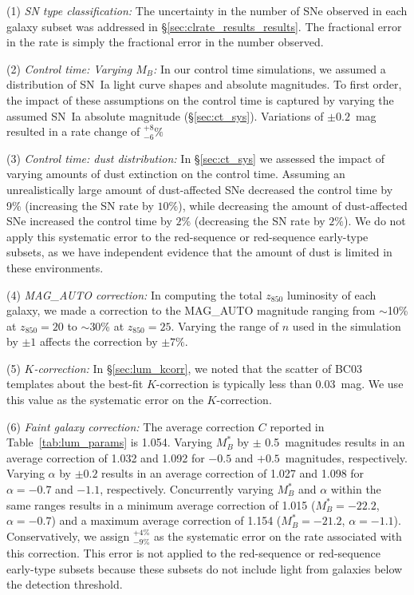 (1) \emph{SN type classification:} The uncertainty in the number of
SNe observed in each galaxy subset was addressed in
\S\ref{sec:clrate_results_results}. The fractional error in the rate is simply the
fractional error in the number observed.

(2) \emph{Control time: Varying $M_B$:} In our control time
simulations, we assumed a distribution of SN~Ia light curve shapes and
absolute magnitudes. To first order, the impact of these assumptions
on the control time is captured by varying the assumed SN~Ia absolute
magnitude (\S\ref{sec:ct_sys}). Variations of $\pm 0.2$~mag resulted in a
rate change of $^{+8}_{-6}\%$

(3) \emph{Control time: dust distribution:} In \S\ref{sec:ct_sys} we
assessed the impact of varying amounts of dust extinction on the
control time. Assuming an unrealistically large amount of
dust-affected SNe decreased the control time by 9\% (increasing the SN
rate by $10\%$), while decreasing the amount of dust-affected SNe
increased the control time by $2\%$ (decreasing the SN rate by
$2\%$). We do not apply this systematic error to the red-sequence or
red-sequence early-type subsets, as we have independent evidence that
the amount of dust is limited in these environments.

(4) \emph{MAG\_AUTO correction:} In computing the total $z_{850}$ luminosity
of each galaxy, we made a correction to the MAG\_AUTO magnitude
ranging from $\sim$10\% at $z_{850}=20$ to $\sim$30\% at
$z_{850}=25$. Varying the range of $n$ used in the simulation by $\pm
1$ affects the correction by $\pm 7\%$.

(5) \emph{$K$-correction:} In \S\ref{sec:lum_kcorr}, we noted that the
scatter of BC03 templates about the best-fit $K$-correction is
typically less than 0.03~mag. We use this value as the systematic
error on the $K$-correction.

(6) \emph{Faint galaxy correction:} The average correction $C$
reported in Table~\ref{tab:lum_params} is 1.054. Varying $M^\ast_B$ by
$\pm$ 0.5~magnitudes results in an average correction of 1.032 and
1.092 for $-0.5$ and $+0.5$~magnitudes, respectively. Varying $\alpha$
by $\pm 0.2$ results in an average correction of 1.027 and 1.098 for
$\alpha = -0.7$ and $-1.1$, respectively. Concurrently varying
$M^\ast_B$ and $\alpha$ within the same ranges results in a minimum
average correction of 1.015 ($M^\ast_B = -22.2$, $\alpha = -0.7$) and a
maximum average correction of 1.154 ($M^\ast_B = -21.2$, $\alpha =
-1.1$). Conservatively, we assign $^{+4\%}_{-9\%}$ as the systematic
error on the rate associated with this correction. This error is not
applied to the red-sequence or red-sequence early-type subsets because
these subsets do not include light from galaxies below the detection
threshold.

